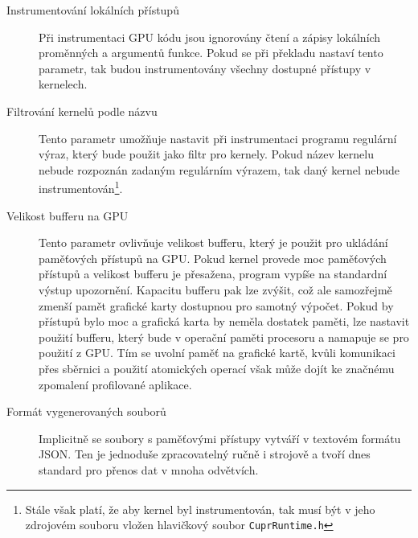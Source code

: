 \begin{description}
    \item[Instrumentování lokálních přístupů] Při instrumentaci GPU kódu jsou ignorovány čtení a zápisy lokálních proměnných a argumentů funkce. Pokud se při překladu nastaví tento parametr, tak budou instrumentovány všechny dostupné přístupy v kernelech.
    \item[Filtrování kernelů podle názvu] Tento parametr umožňuje nastavit při instrumentaci programu regulární výraz, který bude použit jako filtr pro kernely. Pokud název kernelu nebude rozpoznán zadaným regulárním výrazem, tak daný kernel nebude instrumentován\footnote{Stále však platí, že aby kernel byl instrumentován, tak musí být v jeho zdrojovém souboru vložen hlavičkový soubor \texttt{CuprRuntime.h}}.
    \item[Velikost bufferu na GPU] Tento parametr ovlivňuje velikost bufferu, který je použit pro ukládání paměťových přístupů na GPU. Pokud kernel provede moc paměťových přístupů a velikost bufferu je přesažena, program vypíše na standardní výstup upozornění. Kapacitu bufferu pak lze zvýšit, což ale samozřejmě zmenší pamět grafické karty dostupnou pro samotný výpočet. Pokud by přístupů bylo moc a grafická karta by neměla dostatek paměti, lze nastavit použití bufferu, který bude v operační paměti procesoru a namapuje se pro použití z GPU. Tím se uvolní paměť na grafické kartě, kvůli komunikaci přes sběrnici a použití atomických operací však může dojít ke značnému zpomalení profilované aplikace.
    \item[Formát vygenerovaných souborů] Implicitně se soubory s paměťovými přístupy vytváří v textovém formátu JSON. Ten je jednoduše zpracovatelný ručně i strojově a tvoří dnes standard pro přenos dat v mnoha odvětvích.

\end{description}
